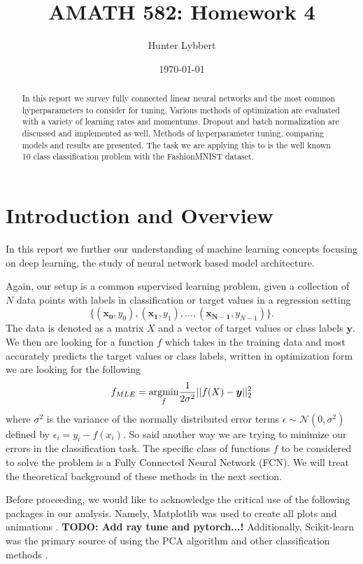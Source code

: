 \documentclass[11pt]{amsart}
\title{AMATH 582: Homework 4}
\author{Hunter Lybbert} %
\date{\today} %
\begin{document}
\maketitle

\begin{abstract}
    In this report we survey fully connected linear neural networks and the most common hyperparameters to consider for tuning.
    Various methods of optimization are evaluated with a variety of learning rates and momentums.
    Dropout and batch normalization are discussed and implemented as well.
    Methods of hyperparameter tuning, comparing models and results are presented.
    The task we are applying this to is the well known 10 class classification problem with the FashionMNIST dataset.
\end{abstract}

\section{Introduction and Overview}\label{sec:Introduction}
In this report we further our understanding of machine learning concepts focusing on deep learning, the study of neural network based model architecture.

Again, our setup is a common supervised learning problem, given a collection of $N$ data points with labels in classification or target values in a regression setting $$\big\{(\bm{x_0}, y_0), (\bm{x_1}, y_1), ..., (\bm{x_{N-1}}, y_{N-1})\big\}.$$
The data is denoted as a matrix $X$ and a vector of target values or class labels $\bm y$.
We then are looking for a function $f$ which takes in the training data and most accurately predicts the target values or class labels, written in optimization form we are looking for the following
$$f_{MLE} = \underset{f}{\rm argmin } \frac 1 {2 \sigma^2}|| f(X) - \bm y ||_2^2$$
where $\sigma^2$ is the variance of the normally distributed error terms $\epsilon \sim \mathcal N (0, \sigma^2)$ defined by $\epsilon_i = y_i - f(x_i)$.
So said another way we are trying to minimize our errors in the classification task.
The specific class of functions $f$ to be considered to solve the problem is a Fully Connected Neural Network (FCN).
We will treat the theoretical background of these methods in the next section.

Before proceeding, we would like to acknowledge the critical use of the following packages in our analysis.
Namely, Matplotlib was used to create all plots and animations \cite{Hunter:2007}.
\textbf{TODO: Add ray tune and pytorch...!}
Additionally, Scikit-learn was the primary source of using the PCA algorithm and other classification methods \cite{scikit-learn}.
\end{document}
